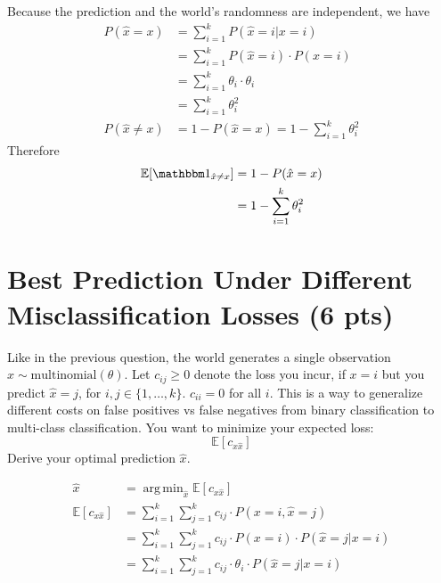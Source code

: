\documentclass[a4paper]{article}
\theoremstyle{definition}
\DeclareMathOperator*{\argmin}{arg\,min}
\def\E{\mathbb E}
\def\ind{\mathbbm 1}
\newenvironment{soln}{
    \leavevmode\color{blue}\ignorespaces
}{}
\begin{document}
\begin{soln}
	Because the prediction and the world's randomness are independent, we have
	\begin{align*}
		P(\hat{x} = x)    & = \sum_{i=1}^{k} P(\hat{x} = i | x = i)              \\
		                  & = \sum_{i=1}^{k}  P(\hat{x} = i) \cdot P(x = i)      \\
		                  & = \sum_{i=1}^{k} \theta_i \cdot \theta_i             \\
		                  & = \sum_{i=1}^{k} \theta_i^2                          \\
		P(\hat{x} \neq x) & = 1 - P(\hat{x} = x) = 1 - \sum_{i=1}^{k} \theta_i^2
	\end{align*}
	Therefore
	\begin{align*}
		\E[\ind_{\hat x \neq x}] & = 1 - P(\hat{x} = x)            \\
		                         & = 1 - \sum_{i=1}^{k} \theta_i^2
	\end{align*}

\end{soln}


\section{Best Prediction Under Different Misclassification Losses (6 pts)}
Like in the previous question,
the world generates a single observation $x \sim \mbox{multinomial}(\theta)$.
Let $c_{ij} \ge 0$ denote the loss you incur, if $x=i$ but you predict $\hat x=j$, for $i,j \in \{1, \ldots, k\}$.
$c_{ii}=0$ for all $i$.
This is a way to generalize different costs on false positives vs false negatives from binary classification to multi-class classification.
You want to minimize your expected loss:
$$\E[c_{x \hat x}]$$
Derive your optimal prediction $\hat x$.

\begin{soln}
	\begin{align*}
		\hat x           & = \argmin_{\hat x} \E[c_{x \hat x}]                                                \\
		\E[c_{x \hat x}] & = \sum_{i=1}^{k} \sum_{j=1}^{k} c_{ij} \cdot P(x = i, \hat{x} = j)                 \\
		                 & = \sum_{i=1}^{k} \sum_{j=1}^{k} c_{ij} \cdot P(x = i) \cdot P(\hat{x} = j | x = i) \\
		                 & = \sum_{i=1}^{k} \sum_{j=1}^{k} c_{ij} \cdot \theta_i \cdot P(\hat{x} = j | x = i) 
	\end{align*}
\end{soln}
\end{document}
